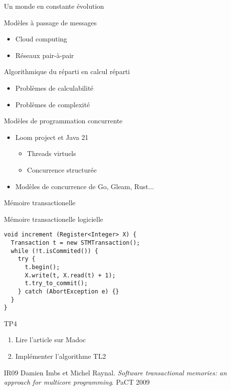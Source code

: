 \begin{frame}[fragile]{Un monde en constante évolution}

 \begin{block}{Modèles à passage de messages}
    \begin{itemize}
    \item Cloud computing
    \item Réseaux pair-à-pair
    \end{itemize}
  \end{block}

 \begin{block}{Algorithmique du réparti en calcul réparti}
    \begin{itemize}
    \item Problèmes de calculabilité
    \item Problèmes de complexité
    \end{itemize}
 \end{block}

   \begin{block}{Modèles de programmation concurrente}
    \begin{itemize}
    \item Loom project et Java 21
    \begin{itemize}
    \item Threads virtuels
    \item Concurrence structurée
    \end{itemize}
    \item Modèles de concurrence de Go, Gleam, Rust...
    \end{itemize}
  \end{block}
\end{frame}




\begin{frame}[fragile]{Mémoire transactionelle}
  \vFill
  \begin{block}{Mémoire transactionelle logicielle}
    \begin{lstlisting}
void increment (Register<Integer> X) {
  Transaction t = new STMTransaction();
  while (!t.isCommited()) {
    try {
      t.begin();
      X.write(t, X.read(t) + 1);
      t.try_to_commit();
    } catch (AbortException e) {}
  }
}
    \end{lstlisting}
  \end{block}
  \pause
  \begin{alertblock}{TP4}
    \begin{enumerate}
    \item Lire l'article sur Madoc
 
    \item Implémenter l'algorithme TL2
    \end{enumerate}
  \end{alertblock}
  \vFill
  
  \begin{citing}
  \item[IR09] Damien Imbs et Michel Raynal. \textit{Software transactional memories: an approach for multicore programming}. PaCT 2009
    \end{citing}
\end{frame}
